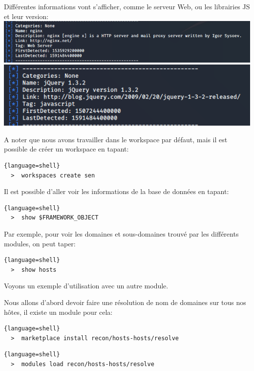 Différentes informations vont s'afficher, comme le serveur Web, ou les librairies JS et leur version: \\

\includegraphics[scale=0.48]{images/SEN_Projet_Image019.png} \\

\includegraphics[scale=0.48]{images/SEN_Projet_Image020.png}

A noter que nous avons travailler dans le workspace par défaut, mais il est possible de créer un workspace en tapant:

\begin{lstlisting}{language=shell}
  >  workspaces create sen
\end{lstlisting}

Il est possible d'aller voir les informations de la base de données en tapant:

\begin{lstlisting}{language=shell}
  >  show $FRAMEWORK_OBJECT
\end{lstlisting}

Par exemple, pour voir les domaines et sous-domaines trouvé par les différents modules, on peut taper:

\begin{lstlisting}{language=shell}
  >  show hosts
\end{lstlisting}

Voyons un exemple d'utilisation avec un autre module.

Nous allons d'abord devoir faire une résolution de nom de domaines sur tous nos hôtes, il existe un module pour cela:

\begin{lstlisting}{language=shell}
  >  marketplace install recon/hosts-hosts/resolve
\end{lstlisting}

\begin{lstlisting}{language=shell}
  >  modules load recon/hosts-hosts/resolve
\end{lstlisting}

